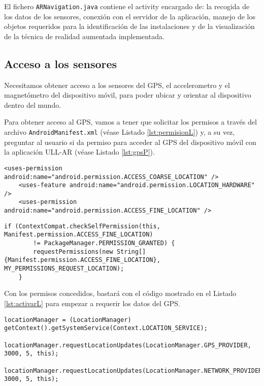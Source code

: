 El fichero \texttt{ARNavigation.java} contiene el activity encargado de: la recogida de los datos de los sensores, conexión con el servidor de la aplicación, manejo de los objetos requeridos para la identificación de las instalaciones y de la visualización de la técnica de realidad aumentada implementada.

\subsection{Acceso a los sensores}

Necesitamos obtener acceso a los sensores del GPS, el accelerometro y el magnetómetro del dispositivo móvil, para poder ubicar y orientar al dispositivo dentro del mundo.

Para obtener acceso al GPS, vamos a tener que solicitar los permisos a través del archivo \texttt{AndroidManifest.xml} (véase Listado \ref{lst:permisionL}) y, a su vez, preguntar al usuario si da permiso para acceder al GPS del dispositivo móvil con la aplicación ULL-AR  (véase Listado \ref{lst:gpsP}).

\begin{lstlisting}[caption={Fichero \texttt{AndroidManifest.xml} del proyecto, permisos para acceder a la ubicación del dispositivo.}, label={lst:permisionL}]
    <uses-permission android:name="android.permission.ACCESS_COARSE_LOCATION" />
    <uses-feature android:name="android.permission.LOCATION_HARDWARE" />
    <uses-permission android:name="android.permission.ACCESS_FINE_LOCATION" />
\end{lstlisting}

\begin{lstlisting}[caption={Código para que el usuario conceda permiso para acceder a la ubicacion del dispositivo.}, label={lst:gpsP}]
    if (ContextCompat.checkSelfPermission(this, Manifest.permission.ACCESS_FINE_LOCATION)
        != PackageManager.PERMISSION_GRANTED) {
        requestPermissions(new String[]{Manifest.permission.ACCESS_FINE_LOCATION},                  MY_PERMISSIONS_REQUEST_LOCATION);   
    }
\end{lstlisting}

Con los permisos concedidos, bastará con el código mostrado en el Listado \ref{lst:activarL} para empezar a requerir los datos del GPS.

\begin{lstlisting}[caption={Código para activar el GPS del dispositivo.}, label={lst:activarL}]
    locationManager = (LocationManager) getContext().getSystemService(Context.LOCATION_SERVICE);
    locationManager.requestLocationUpdates(LocationManager.GPS_PROVIDER, 3000, 5, this);
    locationManager.requestLocationUpdates(LocationManager.NETWORK_PROVIDER, 3000, 5, this);
\end{lstlisting}


